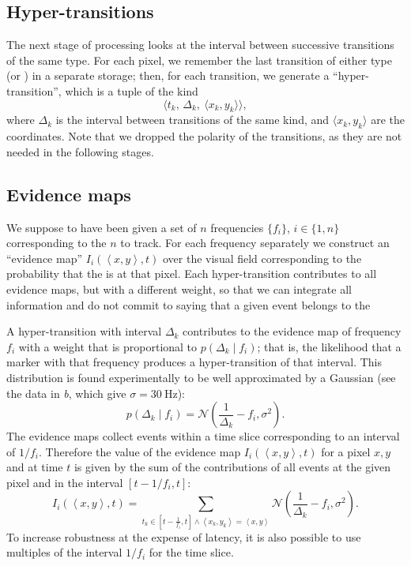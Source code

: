 \subsection{Hyper-transitions}

The next stage of processing looks at the interval between successive
transitions of the same type. For each pixel, we remember the last
transition of either type (\pPN or \pNP) in a separate storage;
then, for each transition, we generate a ``hyper-transition'', which
is a tuple of the kind 
\[
\langle t_{k},\,\Delta_{k},\:\langle x_{k},y_{k}\rangle\rangle,
\]
where $\Delta_{k}$ is the interval between transitions of the same
kind, and $\langle x_{k},y_{k}\rangle$ are the coordinates. Note
that we dropped the polarity of the transitions, as they are not needed
in the following stages.


\subsection{Evidence maps}

We suppose to have been given a set of $n$ frequencies $\{f_{i}\}$,
$i\in\{1,n\}$ corresponding to the $n$ \ALMs to track. For each
frequency separately we construct an ``evidence map'' $I_{i}(\left\langle x,y\right\rangle ,t)$
over the visual field corresponding to the probability that the \ALM
is at that pixel. Each hyper-transition contributes to all evidence
maps, but with a different weight, so that we can integrate all information
and do not commit to saying that a given event belongs to the 

A hyper-transition with interval $\Delta_{k}$ contributes to the
evidence map of frequency $f_{i}$ with a weight that is proportional
to $p(\Delta_{k}\mid f_{i})$; that is, the likelihood that a marker
\ALM with that frequency produces a hyper-transition of that interval.
This distribution is found experimentally to be well approximated
by a Gaussian (see the data in \emph{b},
which give $\sigma=30\ \mbox{Hz}$): 
\begin{equation}
p(\Delta_{k}\mid f_{i})=\mathcal{N}\left(\frac{1}{\Delta_{k}}-f_{i},\sigma^{2}\right).\label{eq:lik_delta}
\end{equation}
The evidence maps collect events within a time slice corresponding
to an interval of $1/f_{i}$. Therefore the value of the evidence
map $I_{i}(\left\langle x,y\right\rangle ,t)$ for a pixel $x,y$
and at time $t$ is given by the sum of the contributions of all events
at the given pixel and in the interval $\left[t-1/f_{i},t\right]$:
\[
I_{i}(\left\langle x,y\right\rangle ,t)=\sum_{t_{k}\in\left[t-\frac{1}{f_{i}},t\right]\wedge\left\langle x_{k},y_{k}\right\rangle =\left\langle x,y\right\rangle }\mathcal{N}\left(\frac{1}{\Delta_{k}}-f_{i},\sigma^{2}\right).
\]
To increase robustness at the expense of latency, it is also possible
to use multiples of the interval $1/f_{i}$ for the time slice.

